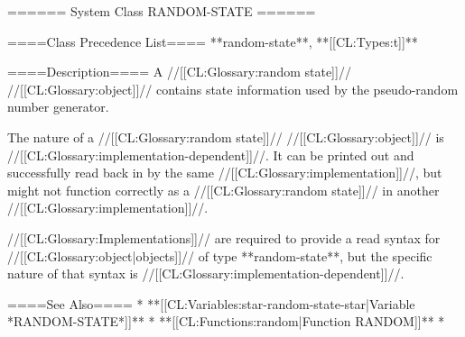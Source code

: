 ====== System Class RANDOM-STATE ======

====Class Precedence List==== 
**random-state**, **[[CL:Types:t]]**

====Description====
A //[[CL:Glossary:random state]]// //[[CL:Glossary:object]]// contains state information used by the pseudo-random number generator.

The nature of a //[[CL:Glossary:random state]]// //[[CL:Glossary:object]]// is //[[CL:Glossary:implementation-dependent]]//. It can be printed out and successfully read back in by the same //[[CL:Glossary:implementation]]//, but might not function correctly as a //[[CL:Glossary:random state]]// in another //[[CL:Glossary:implementation]]//.

//[[CL:Glossary:Implementations]]// are required to provide a read syntax for //[[CL:Glossary:object|objects]]// of type **random-state**, but the specific nature of that syntax is //[[CL:Glossary:implementation-dependent]]//.

====See Also====
  * **[[CL:Variables:star-random-state-star|Variable *RANDOM-STATE*]]**
  * **[[CL:Functions:random|Function RANDOM]]**
  * {\secref\PrintingRandomStates}

